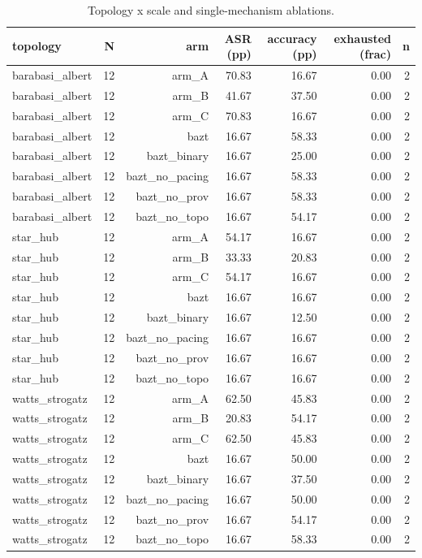 \begin{table}[t]
\centering
\caption{Topology x scale and single-mechanism ablations.}
\label{tab:ablations}
\begin{tabular}{lrrrrrr}
\toprule
topology & N & arm & ASR (pp) & accuracy (pp) & exhausted (frac) & n \\
\midrule
barabasi\_albert & 12 & arm_A & 70.83 & 16.67 & 0.00 & 2 \\
barabasi\_albert & 12 & arm_B & 41.67 & 37.50 & 0.00 & 2 \\
barabasi\_albert & 12 & arm_C & 70.83 & 16.67 & 0.00 & 2 \\
barabasi\_albert & 12 & bazt & 16.67 & 58.33 & 0.00 & 2 \\
barabasi\_albert & 12 & bazt_binary & 16.67 & 25.00 & 0.00 & 2 \\
barabasi\_albert & 12 & bazt_no_pacing & 16.67 & 58.33 & 0.00 & 2 \\
barabasi\_albert & 12 & bazt_no_prov & 16.67 & 58.33 & 0.00 & 2 \\
barabasi\_albert & 12 & bazt_no_topo & 16.67 & 54.17 & 0.00 & 2 \\
star\_hub & 12 & arm_A & 54.17 & 16.67 & 0.00 & 2 \\
star\_hub & 12 & arm_B & 33.33 & 20.83 & 0.00 & 2 \\
star\_hub & 12 & arm_C & 54.17 & 16.67 & 0.00 & 2 \\
star\_hub & 12 & bazt & 16.67 & 16.67 & 0.00 & 2 \\
star\_hub & 12 & bazt_binary & 16.67 & 12.50 & 0.00 & 2 \\
star\_hub & 12 & bazt_no_pacing & 16.67 & 16.67 & 0.00 & 2 \\
star\_hub & 12 & bazt_no_prov & 16.67 & 16.67 & 0.00 & 2 \\
star\_hub & 12 & bazt_no_topo & 16.67 & 16.67 & 0.00 & 2 \\
watts\_strogatz & 12 & arm_A & 62.50 & 45.83 & 0.00 & 2 \\
watts\_strogatz & 12 & arm_B & 20.83 & 54.17 & 0.00 & 2 \\
watts\_strogatz & 12 & arm_C & 62.50 & 45.83 & 0.00 & 2 \\
watts\_strogatz & 12 & bazt & 16.67 & 50.00 & 0.00 & 2 \\
watts\_strogatz & 12 & bazt_binary & 16.67 & 37.50 & 0.00 & 2 \\
watts\_strogatz & 12 & bazt_no_pacing & 16.67 & 50.00 & 0.00 & 2 \\
watts\_strogatz & 12 & bazt_no_prov & 16.67 & 54.17 & 0.00 & 2 \\
watts\_strogatz & 12 & bazt_no_topo & 16.67 & 58.33 & 0.00 & 2 \\
\bottomrule
\end{tabular}
\end{table}
